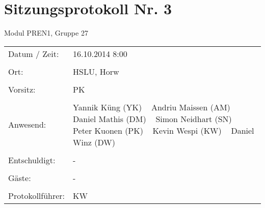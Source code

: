 \documentclass[a4paper,10pt,fleqn]{article}
\begin{document}
\section*{Sitzungsprotokoll Nr. 3}
Modul PREN1, Gruppe 27

\begin{longtable}[l]{@{}p{}@{}p{}@{}}
    Datum / Zeit: &
        16.10.2014 8:00
        \\\\
    Ort: &
        HSLU, Horw
        \\\\
    Vorsitz: &
        PK
        \\\\
    Anwesend: &
        Yannik Küng (YK) ~
        Andriu Maissen (AM) ~
        Daniel Mathis (DM) ~
        Simon Neidhart (SN) ~
        Peter Kuonen (PK) ~
        Kevin Wespi (KW) ~
        Daniel Winz (DW) ~
        \\\\
    Entschuldigt: &
        - ~
        \\\\
    Gäste: &
        - ~
        \\\\
    Protokollführer: &
        KW
        \\
\end{longtable}
%
\end{document}
